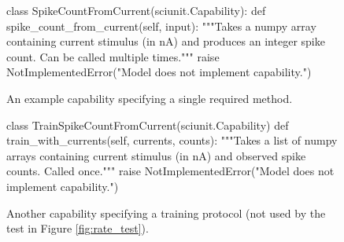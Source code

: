 \documentclass[11pt,letterpaper]{article}
\begin{document}
%
\begin{figure}
\begin{python}
class SpikeCountFromCurrent(sciunit.Capability):
  def spike_count_from_current(self, input): 
    """Takes a numpy array containing current stimulus (in nA) and
    produces an integer spike count. Can be called multiple times."""
    raise NotImplementedError("Model does not implement capability.")
\end{python}
\caption{An example capability specifying a single required method.}
\label{fig:capability}
\end{figure}

\begin{figure}
\begin{python}
class TrainSpikeCountFromCurrent(sciunit.Capability)
  def train_with_currents(self, currents, counts):
    """Takes a list of numpy arrays containing current stimulus (in nA) and
    observed spike counts. Called once."""
    raise NotImplementedError("Model does not implement capability.")
\end{python}
\caption{Another capability specifying a training protocol (not used by the test in Figure \ref{fig:rate_test}).}
\label{fig:training}
\end{figure}
\end{document}
